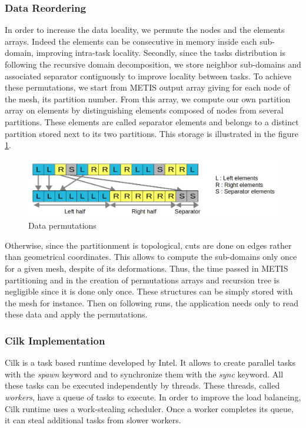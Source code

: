 \documentclass{IOS-Book-Article}
\begin{document}
\subsubsection{Data Reordering}
In order to increase the data locality, we permute the nodes and the elements arrays.
Indeed the elements can be consecutive in memory inside each sub-domain, improving intra-task locality.
Secondly, since the tasks distribution is following the recursive domain decomposition, we store neighbor sub-domains and associated separator contiguously to improve locality between tasks.
To achieve these permutations, we start from METIS output array giving for each node of the mesh, its partition number.
From this array, we compute our own partition array on elements by distinguishing elements composed of nodes from several partitions.
These elements are called separator elements and belongs to a distinct partition stored next to its two partitions.
This storage is illustrated in the figure \ref{fig:dataPermut}.
\begin{figure}[htp]
 \centering
 \includegraphics[scale=0.25]{Data_permutations.png}
 \caption{Data permutations}
 \label{fig:dataPermut}
\end{figure}

Otherwise, since the partitionment is topological, cuts are done on edges rather than geometrical coordinates.
This allows to compute the sub-domains only once for a given mesh, despite of its deformations.
Thus, the time passed in METIS partitioning and in the creation of permutations arrays and recursion tree is negligible since it is done only once.
These structures can be simply stored with the mesh for instance. Then on following runs, the application needs only to read these data and apply the permutations.

\subsubsection{Cilk Implementation}
Cilk is a task based runtime developed by Intel. It allows to create parallel tasks with the \emph{spawn} keyword and to synchronize them with the \emph{sync} keyword.
All these tasks can be executed independently by threads. These threads, called \emph{workers}, have a queue of tasks to execute.
In order to improve the load balancing, Cilk runtime uses a work-stealing scheduler. Once a worker completes its queue, it can steal additional tasks from slower workers.
\end{document}
